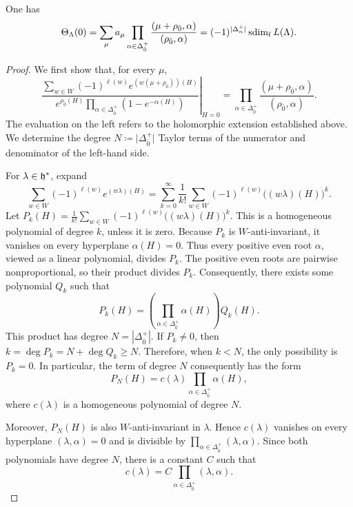 \begin{theorem}\label{thm::L_packet_and_sdim}
One has
\[
\Theta_\Lambda(0)
=
\sum_\mu a_\mu
\prod_{\alpha\in\Delta_{\bar0}^{+}}
\frac{(\mu+\rho_{\bar0},\alpha)}
     {(\rho_{\bar0},\alpha)}
=
(-1)^{|\Delta_n^+|}\operatorname{sdim}_{\mathrm f} L(\Lambda).
\]
\end{theorem}

\begin{proof}
We first show that, for every $\mu$,
\begin{equation}\label{eq::evaluation_mu_single}
\left.
\frac{
\sum_{w\in W}(-1)^{\ell(w)}
e^{(w(\mu+\rho_{\bar0}))(H)}
}{
 e^{\rho_{\bar0}(H)}
\prod_{\alpha\in\Delta_{\bar0}^{+}}(1-e^{-\alpha(H)})
}
\right|_{H=0}
=
\prod_{\alpha\in\Delta_{\bar0}^{+}}
\frac{(\mu+\rho_{\bar0},\alpha)}
     {(\rho_{\bar0},\alpha)}.
\end{equation}
The evaluation on the left refers to the holomorphic extension established above. We determine the degree $N\coloneqq \vert \Delta_{\bar{0}}^{+}\vert$ Taylor terms of the numerator and denominator of the left-hand side. 
 
For $\lambda\in{\mathfrak h}^*$, expand
\[
\sum_{w\in W}(-1)^{\ell(w)}e^{(w\lambda)(H)}
=
\sum_{k=0}^{\infty}\frac1{k!}
\sum_{w\in W}(-1)^{\ell(w)}\bigl((w\lambda)(H)\bigr)^k.
\]
Let
$
P_k(H)
=
\frac1{k!}\sum_{w\in W}(-1)^{\ell(w)}
\bigl((w\lambda)(H)\bigr)^k.
$
This is a homogeneous polynomial of degree $k$, unless it is zero.
Because $P_k$ is $W$-anti-invariant, it vanishes on every hyperplane $\alpha(H)=0$. Thus every positive even root $\alpha$, viewed as a linear polynomial, divides $P_k$. The positive even roots are pairwise nonproportional, so their product divides $P_k$. Consequently, there exists some polynomial $Q_{k}$ such that
\[
P_k(H)
=
\left(\prod_{\alpha\in\Delta_{\bar0}^{+}}\alpha(H)\right)Q_k(H).
\]
This product has degree $N=|\Delta_{\bar0}^{+}|$. If $P_k\neq0$, then
$
k=\deg P_k=N+\deg Q_k\ge N.
$
Therefore, when $k<N$, the only possibility is
$P_k=0$. In particular, the term of degree $N$ consequently has the form
\[
P_{N}(H)
=
c(\lambda)\prod_{\alpha\in\Delta_{\bar0}^{+}}\alpha(H),
\]
where $c(\lambda)$ is a homogeneous polynomial of degree $N$.

Moreover, $P_{N}(H)$ is also $W$-anti-invariant in $\lambda$. Hence $c(\lambda)$ vanishes on every hyperplane $(\lambda,\alpha)=0$ and is divisible by
$
\prod_{\alpha\in\Delta_{\bar0}^{+}}(\lambda,\alpha).
$
Since both polynomials have degree $N$, there is a constant $C$ such that
\[
c(\lambda)
=
C\prod_{\alpha\in\Delta_{\bar0}^{+}}(\lambda,\alpha).
\]


\end{proof}
